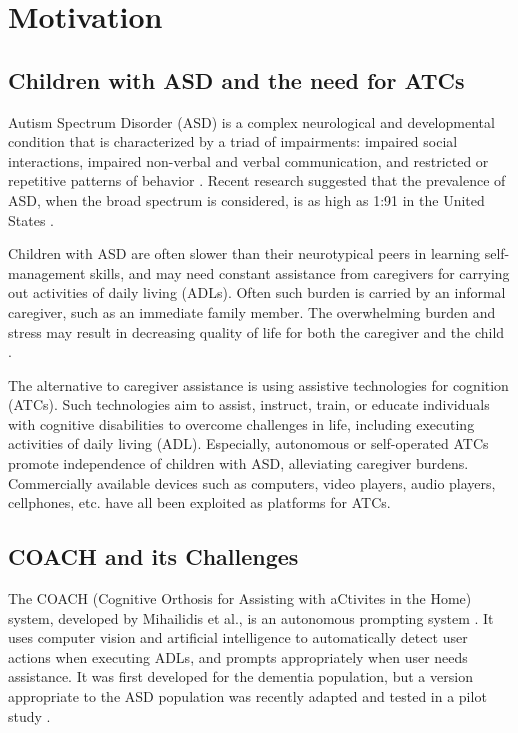 \section{Motivation}

\subsection{Children with ASD and the need for ATCs}

Autism Spectrum Disorder (ASD) is a complex neurological and developmental condition that is characterized by a triad of impairments: impaired social interactions, impaired non-verbal and verbal communication, and restricted or repetitive patterns of behavior \cite{frith2005autism}.  Recent research suggested that the prevalence of ASD, when the broad spectrum is considered, is as high as 1:91 in the United States \cite{kogan2009prevalence}.


Children with ASD are often slower than their neurotypical peers in learning self-management skills, and may need constant assistance from caregivers for carrying out activities of daily living (ADLs).  Often such burden is carried by an informal caregiver, such as an immediate family member.  The overwhelming burden and stress may result in decreasing quality of life for both the caregiver and the child \cite{burgess2007quality}.


The alternative to caregiver assistance is using assistive technologies for cognition (ATCs).  Such technologies aim to assist, instruct, train, or educate individuals with cognitive disabilities to overcome challenges in life, including executing activities of daily living (ADL).  Especially, autonomous or self-operated ATCs promote independence of children with ASD, alleviating caregiver burdens.  Commercially available devices such as computers, video players, audio players, cellphones, etc. have all been exploited as platforms for ATCs.


\subsection{COACH and its Challenges}

The COACH (Cognitive Orthosis for Assisting with aCtivites in the Home) system, developed by Mihailidis et al., is an autonomous prompting system \cite{mihailidis2008coach}.  It uses computer vision and artificial intelligence to automatically detect user actions when executing ADLs, and prompts appropriately when user needs assistance.  It was first developed for the dementia population, but a version appropriate to the ASD population was recently adapted and tested in a pilot study \cite{bimbrahw2012investigating}.


